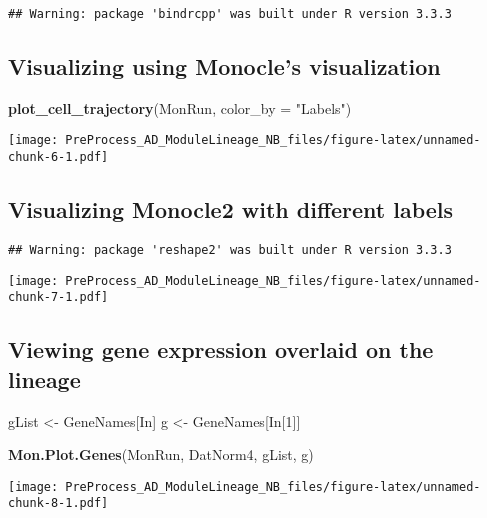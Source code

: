 \documentclass[]{article}
\newenvironment{Shaded}{\begin{snugshade}}{\end{snugshade}}
\newcommand{\KeywordTok}[1]{\textcolor[rgb]{0.13,0.29,0.53}{\textbf{#1}}}
\newcommand{\DataTypeTok}[1]{\textcolor[rgb]{0.13,0.29,0.53}{#1}}
\newcommand{\DecValTok}[1]{\textcolor[rgb]{0.00,0.00,0.81}{#1}}
\newcommand{\StringTok}[1]{\textcolor[rgb]{0.31,0.60,0.02}{#1}}
\newcommand{\OperatorTok}[1]{\textcolor[rgb]{0.81,0.36,0.00}{\textbf{#1}}}
\newcommand{\NormalTok}[1]{#1}
\begin{document}
\begin{verbatim}
## Warning: package 'bindrcpp' was built under R version 3.3.3
\end{verbatim}

\subsection{Visualizing using Monocle's
visualization}\label{visualizing-using-monocles-visualization}

\begin{Shaded}
\begin{Highlighting}[]
\KeywordTok{plot_cell_trajectory}\NormalTok{(MonRun, }\DataTypeTok{color_by =} \StringTok{"Labels"}\NormalTok{)}
\end{Highlighting}
\end{Shaded}

\texttt{[image: PreProcess\_AD\_ModuleLineage\_NB\_files/figure-latex/unnamed-chunk-6-1.pdf]}

\subsection{Visualizing Monocle2 with different
labels}\label{visualizing-monocle2-with-different-labels}

\begin{Shaded}
\end{Shaded}

\begin{verbatim}
## Warning: package 'reshape2' was built under R version 3.3.3
\end{verbatim}

\texttt{[image: PreProcess\_AD\_ModuleLineage\_NB\_files/figure-latex/unnamed-chunk-7-1.pdf]}

\subsection{Viewing gene expression overlaid on the
lineage}\label{viewing-gene-expression-overlaid-on-the-lineage}

\begin{Shaded}
\begin{Highlighting}[]
\NormalTok{gList <-}\StringTok{ }\NormalTok{GeneNames[In]}
\NormalTok{g <-}\StringTok{ }\NormalTok{GeneNames[In[}\DecValTok{1}\NormalTok{]]}
  
\KeywordTok{Mon.Plot.Genes}\NormalTok{(MonRun, DatNorm4, gList, g)}
\end{Highlighting}
\end{Shaded}

\texttt{[image: PreProcess\_AD\_ModuleLineage\_NB\_files/figure-latex/unnamed-chunk-8-1.pdf]}
\end{document}
